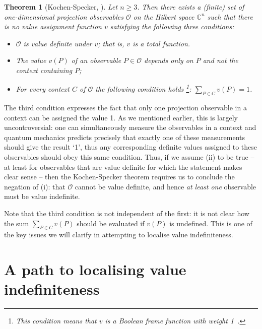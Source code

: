 \documentclass[%
 superscriptaddress,
 preprint,
 showpacs,
 showkeys,
 nofootinbib,
  amsmath,amssymb,
  aps,
  longbibliography,
  floatfix,
 ]{revtex4-1}
\newtheorem{theorem}{Theorem}
\theoremstyle{definition}
\newcommand{\C}{\mathbb{C}}
\begin{document}
\begin{theorem}[Kochen-Specker, \cite{Kochen:1967fk}]
	Let $n\ge 3$.
	Then there exists a (finite) set of {\color{blue}one-dimensional} projection observables $\mathcal{O}$ on the Hilbert space $\C^n$ such that there is no value assignment function $v$ satisfying the following three conditions:
	\begin{itemize}
		\item[(i)] $\mathcal{O}$ is value definite under $v$; that is, $v$ is a total function.
		\item[(ii)] The value $v(P)$ of an observable $P\in\mathcal{O}$ depends only on $P$ and not the context containing $P$;
		\item[(iii)] For every context $C$ of $\mathcal{O}$ the following condition holds%
		\footnote{This condition means that $v$ is a \emph{Boolean frame function} with weight 1~\cite{Gleason:1957ty}.}:
		$\sum_{P\in C}v(P)=1$.
	\end{itemize}
\end{theorem}


The third condition expresses the fact that only one projection observable in a context can be assigned the value 1.
As we mentioned earlier, this is largely uncontroversial: one can simultaneously measure the observables in a context and quantum mechanics predicts precisely that exactly one of these measurements should give the result `1', thus any corresponding definite values assigned to these observables should obey this same condition.
Thus, if we  assume (ii) to be true -- at least for observables that are value definite for which the statement makes clear sense -- then the Kochen-Specker theorem requires us to conclude the negation of (i): that $\mathcal{O}$ cannot be value definite, and hence \emph{at least one} observable must be value indefinite.

Note that the third condition is not independent of the first: it is not clear how the sum $\sum_{P\in C}v(P)$ should be evaluated if $v(P)$ is undefined.
This is one of the key issues we will clarify in attempting to localise value indefiniteness.


\section{A path to localising value indefiniteness}
\end{document}
